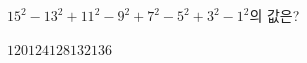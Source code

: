 $15^2-13^2+11^2-9^2+7^2-5^2+3^2-1^2$의 값은?
\begin{choices32}{$120$}{$124$}{$128$}{$132$}{$136$}\end{choices32}
